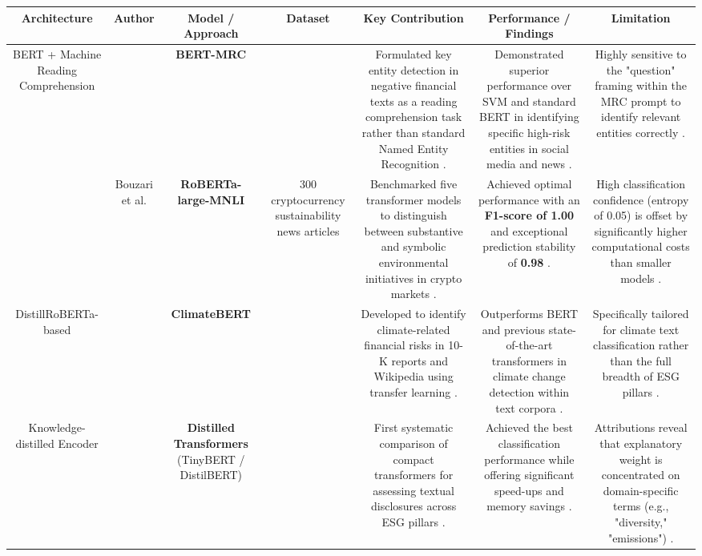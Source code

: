 \documentclass{article}
\begin{document}
\begin{table}[h!]
\centering
\begin{tabular}{|c|c|c|c|c|c|c|}
\hline
Architecture & Author & Model / Approach & Dataset & Key Contribution & Performance / Findings & Limitation \\ \hline
BERT + Machine Reading Comprehension &  \parencite{lingyun_zhao_89567bb2} & \textbf{BERT-MRC}  & ~ & Formulated key entity detection in negative financial texts as a reading comprehension task rather than standard Named Entity Recognition  \parencite{lingyun_zhao_89567bb2}. & Demonstrated superior performance over SVM and standard BERT in identifying specific high-risk entities in social media and news  \parencite{lingyun_zhao_89567bb2}. & Highly sensitive to the "question" framing within the MRC prompt to identify relevant entities correctly  \parencite{lingyun_zhao_89567bb2}. \\ \hline
~ & Bouzari et al.  \parencite{parisa_bouzari_29e9a5b5} & \textbf{RoBERTa-large-MNLI} & 300 cryptocurrency sustainability news articles  \parencite{parisa_bouzari_29e9a5b5} & Benchmarked five transformer models to distinguish between substantive and symbolic environmental initiatives in crypto markets  \parencite{parisa_bouzari_29e9a5b5}. & Achieved optimal performance with an \textbf{F1-score of 1.00} and exceptional prediction stability of \textbf{0.98}  \parencite{parisa_bouzari_29e9a5b5}. & High classification confidence (entropy of 0.05) is offset by significantly higher computational costs than smaller models  \parencite{parisa_bouzari_29e9a5b5}. \\ \hline
DistillRoBERTa-based &  \parencite{eduardo_c__garrido_merch_n_5c6b0bfa} & \textbf{ClimateBERT}  & ~ & Developed to identify climate-related financial risks in 10-K reports and Wikipedia using transfer learning  \parencite{eduardo_c__garrido_merch_n_5c6b0bfa}. & Outperforms BERT and previous state-of-the-art transformers in climate change detection within text corpora  \parencite{eduardo_c__garrido_merch_n_5c6b0bfa}. & Specifically tailored for climate text classification rather than the full breadth of ESG pillars  \parencite{eduardo_c__garrido_merch_n_5c6b0bfa}. \\ \hline
Knowledge-distilled Encoder &  \parencite{yasser_elouargui_76ecc66a} & \textbf{Distilled Transformers} (TinyBERT / DistilBERT)  \parencite{yasser_elouargui_76ecc66a} & ~ & First systematic comparison of compact transformers for assessing textual disclosures across ESG pillars  \parencite{yasser_elouargui_76ecc66a}. & Achieved the best classification performance while offering significant speed-ups and memory savings  \parencite{yasser_elouargui_76ecc66a}. & Attributions reveal that explanatory weight is concentrated on domain-specific terms (e.g., "diversity," "emissions")  \parencite{yasser_elouargui_76ecc66a}. \\ \hline

\end{tabular}
\end{table}
\end{document}
